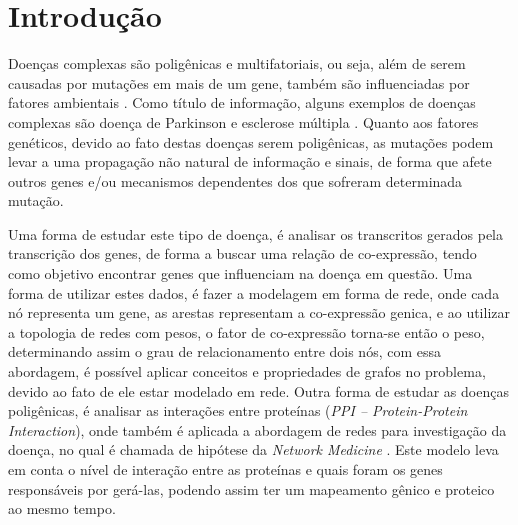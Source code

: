 \newcommand{\itab}[1]{\hspace{0em}\rlap{#1}}
\newcommand{\tab}[1]{\hspace{.2\textwidth}\rlap{#1}}
\chapter[Introdução]{Introdução}


Doenças complexas são poligênicas e multifatoriais, ou seja, além de serem causadas por mutações em mais de um gene, também são influenciadas por fatores ambientais \cite{davey-mith}. Como título de informação, alguns exemplos de doenças complexas são doença de Parkinson e esclerose múltipla \cite{Hunter-2005}. Quanto aos fatores genéticos, devido ao fato destas doenças serem poligênicas, as mutações podem levar a uma propagação não natural de informação e sinais, de forma que afete outros genes e/ou mecanismos dependentes dos que sofreram determinada mutação. 




Uma forma de estudar este tipo de doença, é analisar os transcritos gerados pela transcrição dos genes, de forma a buscar uma relação de co-expressão, tendo como objetivo encontrar genes que influenciam na doença em questão. Uma forma de utilizar estes dados, é fazer a modelagem em forma de rede, onde cada nó representa um gene, as arestas representam a co-expressão genica, e ao utilizar a topologia de redes com pesos, o fator de co-expressão torna-se então o peso, determinando assim o grau de relacionamento entre dois nós, com essa abordagem, é possível aplicar conceitos e propriedades de grafos no problema, devido ao fato de ele estar modelado em rede.
Outra forma de estudar as doenças poligênicas, é analisar as interações entre proteínas (\textit{PPI – Protein-Protein Interaction}), onde também é aplicada a abordagem de redes para investigação da doença, no qual é chamada de hipótese da \textit{Network Medicine} \cite{barabasi}. Este modelo leva em conta o nível de interação entre as proteínas e quais foram os genes responsáveis por gerá-las, podendo assim ter um mapeamento gênico e proteico ao mesmo tempo.

